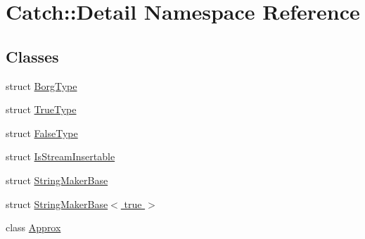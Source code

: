 \hypertarget{namespace_catch_1_1_detail}{\section{Catch\-:\-:Detail Namespace Reference}
\label{namespace_catch_1_1_detail}
}
\subsection*{Classes}
\begin{DoxyCompactItemize}
\item 
struct \hyperlink{struct_catch_1_1_detail_1_1_borg_type}{Borg\-Type}
\item 
struct \hyperlink{struct_catch_1_1_detail_1_1_true_type}{True\-Type}
\item 
struct \hyperlink{struct_catch_1_1_detail_1_1_false_type}{False\-Type}
\item 
struct \hyperlink{struct_catch_1_1_detail_1_1_is_stream_insertable}{Is\-Stream\-Insertable}
\item 
struct \hyperlink{struct_catch_1_1_detail_1_1_string_maker_base}{String\-Maker\-Base}
\item 
struct \hyperlink{struct_catch_1_1_detail_1_1_string_maker_base_3_01true_01_4}{String\-Maker\-Base$<$ true $>$}
\item 
class \hyperlink{class_catch_1_1_detail_1_1_approx}{Approx}
\end{DoxyCompactItemize}
